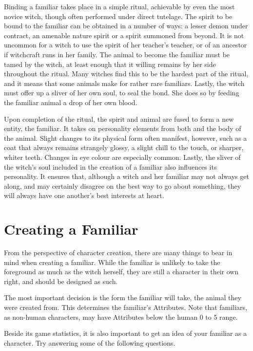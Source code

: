 Binding a familiar takes place in a simple ritual, achievable by even the most novice witch, though often performed under direct tutelage.
The spirit to be bound to the familiar can be obtained in a number of ways: a lesser demon under contract, an amenable nature spirit or a spirit summoned from beyond.
It is not uncommon for a witch to use the spirit of her teacher's teacher, or of an ancestor if witchcraft runs in her family.
The animal to become the familiar must be tamed by the witch, at least enough that it willing remains by her side throughout the ritual.
Many witches find this to be the hardest part of the ritual, and it means that some animals make for rather rare familiars.
Lastly, the witch must offer up a sliver of her own soul, to seal the bond.
She does so by feeding the familiar animal a drop of her own blood.

Upon completion of the ritual, the spirit and animal are fused to form a new entity, the familiar.
It takes on personality elements from both and the body of the animal.
Slight changes to its physical form often manifest, however, such as a coat that always remains strangely glossy, a slight chill to the touch, or sharper, whiter teeth.
Changes in eye colour are especially common.
Lastly, the sliver of the witch's soul included in the creation of a familiar also influences its personality.
It ensures that, although a witch and her familiar may not always get along, and may certainly disagree on the best way to go about something, they will always have one another's best interests at heart.

\section{Creating a Familiar}

From the perspective of character creation, there are many things to bear in mind when creating a familiar.
While the familiar is unlikely to take the foreground as much as the witch herself, they are still a character in their own right, and should be designed as such.

The most important decision is the form the familiar will take, the animal they were created from.
This determines the familiar's Attributes.
Note that familiars, as non-human characters, may have Attributes below the human 0 to 5 range.


Beside its game statistics, it is also important to get an idea of your familiar as a character.
Try answering some of the following questions.

